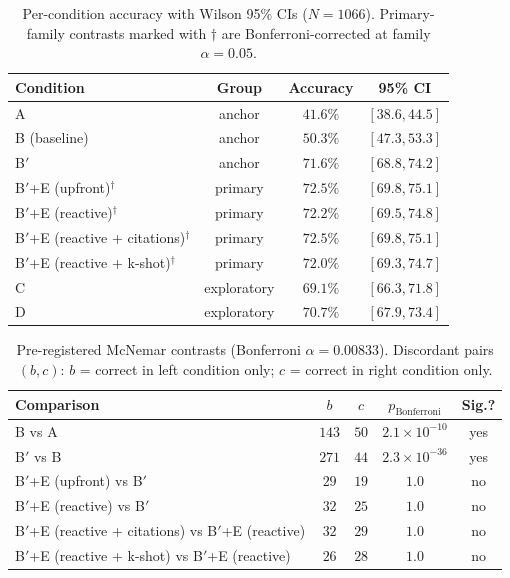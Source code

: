 \begin{table}[!htbp]
  \centering
  \caption{Per-condition accuracy with Wilson 95\% CIs ($N=1066$).
  Primary-family contrasts marked with $\dagger$ are
  Bonferroni-corrected at family $\alpha=0.05$.}
  \label{tab:accuracy}
  \begin{tabular}{lccc}
    \toprule
    Condition & Group & Accuracy & 95\% CI \\
    \midrule
    A                                & anchor       & $41.6\%$ & $[38.6, 44.5]$ \\
    B (baseline)                     & anchor       & $50.3\%$ & $[47.3, 53.3]$ \\
    B$'$                             & anchor       & $71.6\%$ & $[68.8, 74.2]$ \\
    B$'$+E (upfront)$^\dagger$        & primary      & $72.5\%$ & $[69.8, 75.1]$ \\
    B$'$+E (reactive)$^\dagger$       & primary      & $72.2\%$ & $[69.5, 74.8]$ \\
    B$'$+E (reactive + citations)$^\dagger$ & primary & $72.5\%$ & $[69.8, 75.1]$ \\
    B$'$+E (reactive + k-shot)$^\dagger$ & primary  & $72.0\%$ & $[69.3, 74.7]$ \\
    C                                & exploratory  & $69.1\%$ & $[66.3, 71.8]$ \\
    D                                & exploratory  & $70.7\%$ & $[67.9, 73.4]$ \\
    \bottomrule
  \end{tabular}
\end{table}

\begin{table}[!htbp]
  \centering
  \caption{Pre-registered McNemar contrasts (Bonferroni
  $\alpha=0.00833$). Discordant pairs $(b, c)$: $b$ = correct in
  left condition only; $c$ = correct in right condition only.}
  \label{tab:mcnemar_primary}
  \begin{tabular}{lcccc}
    \toprule
    Comparison & $b$ & $c$ & $p_{\text{Bonferroni}}$ & Sig.? \\
    \midrule
    B vs A                                                       & $143$ & $50$ & $2.1\times10^{-10}$ & yes \\
    B$'$ vs B                                                    & $271$ & $44$ & $2.3\times10^{-36}$ & yes \\
    B$'$+E (upfront) vs B$'$                                     & $29$  & $19$ & $1.0$               & no  \\
    B$'$+E (reactive) vs B$'$                                    & $32$  & $25$ & $1.0$               & no  \\
    B$'$+E (reactive + citations) vs B$'$+E (reactive)           & $32$  & $29$ & $1.0$               & no  \\
    B$'$+E (reactive + k-shot) vs B$'$+E (reactive)              & $26$  & $28$ & $1.0$               & no  \\
    \bottomrule
  \end{tabular}
\end{table}

